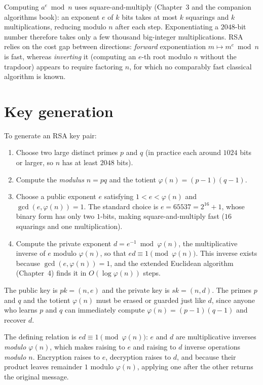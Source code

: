 \begin{connectionbox}
Computing $a^e \bmod n$ uses square-and-multiply (Chapter~3 and the companion algorithms book): an exponent $e$ of $k$ bits takes at most $k$ squarings and $k$ multiplications, reducing modulo $n$ after each step. Exponentiating a $2048$-bit number therefore takes only a few thousand big-integer multiplications. RSA relies on the cost gap between directions: \emph{forward} exponentiation $m \mapsto m^e \bmod n$ is fast, whereas \emph{inverting} it (computing an $e$-th root modulo $n$ without the trapdoor) appears to require factoring $n$, for which no comparably fast classical algorithm is known.
\end{connectionbox}

\section{Key generation}
\label{ch19:keygen}

To generate an RSA key pair:

\begin{enumerate}
  \item Choose two large distinct primes $p$ and $q$ (in practice each around $1024$ bits or larger, so $n$ has at least $2048$ bits).
  \item Compute the \emph{modulus} $n = pq$ and the totient $\varphi(n) = (p-1)(q-1)$.
  \item Choose a public exponent $e$ satisfying $1 < e < \varphi(n)$ and $\gcd(e,\varphi(n))=1$. The standard choice is $e = 65537 = 2^{16} + 1$, whose binary form has only two $1$-bits, making square-and-multiply fast ($16$ squarings and one multiplication).
  \item Compute the private exponent $d = e^{-1} \bmod \varphi(n)$, the multiplicative inverse of $e$ modulo $\varphi(n)$, so that $ed \equiv 1 \pmod{\varphi(n)}$. This inverse exists because $\gcd(e,\varphi(n))=1$, and the extended Euclidean algorithm (Chapter~4) finds it in $O(\log \varphi(n))$ steps.
\end{enumerate}

The public key is $pk = (n, e)$ and the private key is $sk = (n, d)$. The primes $p$ and $q$ and the totient $\varphi(n)$ must be erased or guarded just like $d$, since anyone who learns $p$ and $q$ can immediately compute $\varphi(n) = (p-1)(q-1)$ and recover $d$.

\begin{focusbox}
The defining relation is $ed \equiv 1 \pmod{\varphi(n)}$: $e$ and $d$ are multiplicative inverses \emph{modulo $\varphi(n)$}, which makes raising to $e$ and raising to $d$ inverse operations \emph{modulo $n$}. Encryption raises to $e$, decryption raises to $d$, and because their product leaves remainder $1$ modulo $\varphi(n)$, applying one after the other returns the original message.
\end{focusbox}

